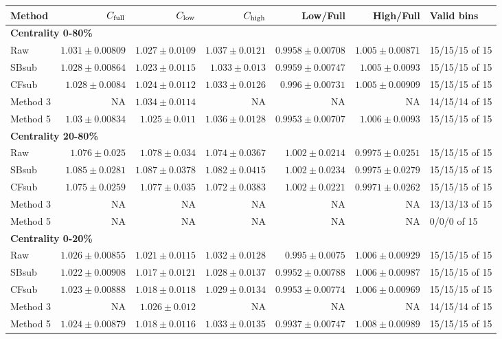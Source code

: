 \documentclass[10pt,a4paper]{article}
\begin{document}
{\scriptsize\setlength{\tabcolsep}{3pt}\begin{longtable}{lrrrrrl}
\hline Method & $C_{\rm full}$ & $C_{\rm low}$ & $C_{\rm high}$ & Low/Full & High/Full & Valid bins\\\hline\endhead
\multicolumn{7}{l}{\textbf{Centrality 0-80\%}}\\
Raw & $1.031\pm0.00809$ & $1.027\pm0.0109$ & $1.037\pm0.0121$ & $0.9958\pm0.00708$ & $1.005\pm0.00871$ & 15/15/15 of 15\\
SBsub & $1.028\pm0.00864$ & $1.023\pm0.0115$ & $1.033\pm0.013$ & $0.9959\pm0.00747$ & $1.005\pm0.0093$ & 15/15/15 of 15\\
CFsub & $1.028\pm0.0084$ & $1.024\pm0.0112$ & $1.033\pm0.0126$ & $0.996\pm0.00731$ & $1.005\pm0.00909$ & 15/15/15 of 15\\
Method 3 & NA & $1.034\pm0.0114$ & NA & NA & NA & 14/15/14 of 15\\
Method 5 & $1.03\pm0.00834$ & $1.025\pm0.011$ & $1.036\pm0.0128$ & $0.9953\pm0.00707$ & $1.006\pm0.0093$ & 15/15/15 of 15\\
\hline
\multicolumn{7}{l}{\textbf{Centrality 20-80\%}}\\
Raw & $1.076\pm0.025$ & $1.078\pm0.034$ & $1.074\pm0.0367$ & $1.002\pm0.0214$ & $0.9975\pm0.0251$ & 15/15/15 of 15\\
SBsub & $1.085\pm0.0281$ & $1.087\pm0.0378$ & $1.082\pm0.0415$ & $1.002\pm0.0234$ & $0.9975\pm0.0279$ & 15/15/15 of 15\\
CFsub & $1.075\pm0.0259$ & $1.077\pm0.035$ & $1.072\pm0.0383$ & $1.002\pm0.0221$ & $0.9971\pm0.0262$ & 15/15/15 of 15\\
Method 3 & NA & NA & NA & NA & NA & 13/13/13 of 15\\
Method 5 & NA & NA & NA & NA & NA & 0/0/0 of 15\\
\hline
\multicolumn{7}{l}{\textbf{Centrality 0-20\%}}\\
Raw & $1.026\pm0.00855$ & $1.021\pm0.0115$ & $1.032\pm0.0128$ & $0.995\pm0.0075$ & $1.006\pm0.00929$ & 15/15/15 of 15\\
SBsub & $1.022\pm0.00908$ & $1.017\pm0.0121$ & $1.028\pm0.0137$ & $0.9952\pm0.00788$ & $1.006\pm0.00987$ & 15/15/15 of 15\\
CFsub & $1.023\pm0.00888$ & $1.018\pm0.0118$ & $1.029\pm0.0134$ & $0.9953\pm0.00774$ & $1.006\pm0.00969$ & 15/15/15 of 15\\
Method 3 & NA & $1.026\pm0.012$ & NA & NA & NA & 14/15/14 of 15\\
Method 5 & $1.024\pm0.00879$ & $1.018\pm0.0116$ & $1.033\pm0.0135$ & $0.9937\pm0.00747$ & $1.008\pm0.00989$ & 15/15/15 of 15\\

\end{longtable}}
\end{document}
